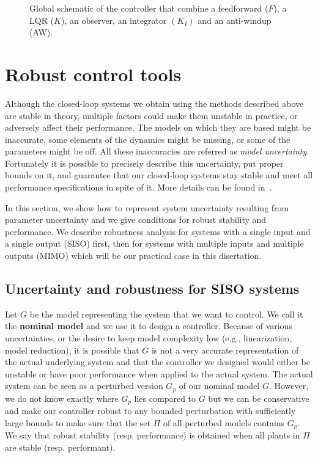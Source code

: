 \documentclass[12pt,lot, lof]{puthesis}
\begin{document}
\begin{figure}

\caption{Global schematic of the controller that combine a feedforward ($F$), a LQR ($K$), an observer, an integrator $(K_I)$ and an anti-windup (AW).}
\label{fig:model13}
\end{figure}



\section{Robust control tools}

Although the closed-loop systems we obtain using the methods described above are stable in theory, multiple factors could make them unstable in practice, or adversely affect their performance.
The models on which they are based might be inaccurate, some elements of the dynamics might be missing, or some of the parameters might be off.
All these inaccuracies are referred as \emph{model uncertainty}.
Fortunately it is possible to precisely describe this uncertainty, put proper bounds on it, and guarantee that our closed-loop systems stay stable and meet all performance specifications in spite of it. More details can be found in~\cite{SandP}.

In this section, we show how to represent system uncertainty resulting from parameter uncertainty and we give conditions for robust stability and performance.
We describe robustness analysis for systems with a single input and a single output (SISO) first, then for systems with multiple inputs and multiple outputs (MIMO) which will be our practical case in this disertation.

\subsection{Uncertainty and robustness for SISO systems}

Let $G$ be the model representing the system that we want to control.
We call it the \textbf{nominal model} and we use it to design a controller.
Because of various uncertainties, or the desire to keep model complexity low (e.g., linearization, model reduction), it is possible that $G$ is not a very accurate representation of the actual underlying system and that the controller we designed would either be unstable or have poor performance when applied to the actual system.
The actual system can be seen as a perturbed version $G_p$ of our nominal model $G$.
However, we do not know exactly where $G_p$ lies compared to $G$ but we can be conservative and make our controller robust to any bounded perturbation with sufficiently large bounds to make sure that the set $\Pi$ of all perturbed models contains $G_p$.
We say that robust stability (resp. performance) is obtained when all plants in $\Pi$ are stable (resp. performant).
\end{document}
